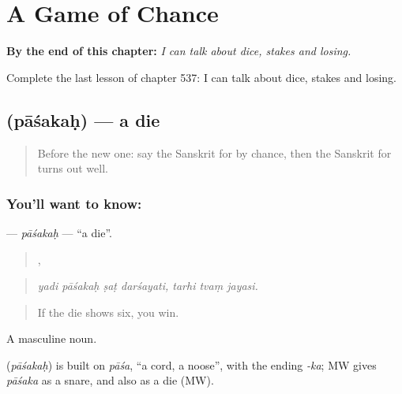 
\chapter{A Game of Chance}
\label{ch:sa-a-game-of-chance}

\begin{chapteropening}
\textbf{By the end of this chapter:} \emph{I can talk about dice, stakes and losing.}

Complete the last lesson of chapter 537: I can talk about dice, stakes and losing.
\end{chapteropening}

\section[\texorpdfstring{\sk{पाशकः} (pāśakaḥ)}{पाशकः (pāśakaḥ)}]{ (pāśakaḥ) — a die}

\label{lesson:SA-C537-pasakah}



\begin{quote}
Before the new one: say the Sanskrit for by chance, then the Sanskrit for turns out well.
\end{quote}

\subsection*{You'll want to know: }
\textbf{} — \emph{pāśakaḥ} — \textquotedblleft{}a die\textquotedblright{}.

\begin{quote}
   ,   
\end{quote}

\begin{quote}
\emph{yadi pāśakaḥ ṣaṭ darśayati, tarhi tvaṃ jayasi.}
\end{quote}

\begin{quote}
If the die shows six, you win.
\end{quote}

A masculine noun.

\begin{cousinweb}
\textbf{} (\emph{pāśakaḥ}) is built on \emph{pāśa}, \textquotedblleft{}a cord, a noose\textquotedblright{}, with the ending \emph{-ka}; MW gives \emph{pāśaka} as a snare, and also as a die (MW).
\end{cousinweb}

